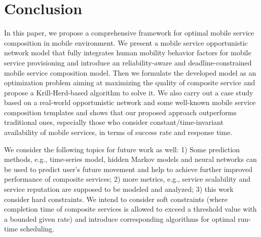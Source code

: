\documentclass[journal]{IEEEtran}
\begin{document}
\section{Conclusion}
In this paper, we propose a comprehensive framework for optimal mobile service composition in mobile environment. We present a mobile service opportunistic network model that fully integrates human mobility behavior factors for mobile service provisioning and introduce an reliability-aware and deadline-constrained mobile service composition model. Then we formulate the developed model as an optimization problem aiming at maximizing the quality of composite service and propose a Krill-Herd-based algorithm to solve it. We also carry out a case study based on a real-world opportunistic network and some well-known mobile service composition templates and shows that our proposed approach outperforms traditional ones, especially those who consider constant/time-invariant availability of mobile services, in terms of success rate and response time.

We consider the following topics for future work as well: 1) Some prediction methods, e.g., time-series model, hidden Markov models and neural networks can be used to predict user's future movement and help to achieve further improved performance of composite services; 2) more metrics, e.g., service scalability and service reputation are supposed to be modeled and  analyzed; 3) this work consider hard constraints. We intend to consider soft constraints (where completion time of composite services is allowed to exceed a threshold value with a bounded given rate) and introduce corresponding algorithms for optimal run-time scheduling.



\ifCLASSOPTIONcaptionsoff
  \newpage
\fi






\end{document}
